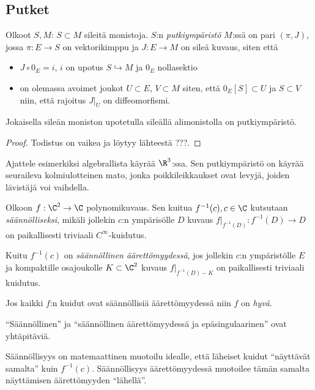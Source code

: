 \subsection{Putket}
\begin{maaritelma}
    Olkoot $S,M$: $S\subset M$ sileitä monistoja. $S$:n \emph{putkiympäristö} $M$:ssä on pari $(\pi, J)$, jossa $\pi: E\to S$ on vektorikimppu ja $J:E\to M$ on sileä kuvaus, siten että
    \begin{itemize}
        \item $J\circ0_E=i$, $i$ on upotus $S\hookrightarrow M$ ja $0_E$ nollasektio
        \item on olemassa avoimet joukot $U\subset E$, $V\subset M$ siten, että $0_E[S]\subset U$ ja $S\subset V$ niin, että rajoitus $J|_U$ on diffeomorfismi.
    \end{itemize}
\end{maaritelma}
\begin{lause}[Putkiympäristölause]
    Jokaisella sileän moniston upotetulla sileällä alimonistolla on putkiympäristö.
\end{lause}
\begin{proof}
    Todistus on vaikea ja löytyy lähteestä ???.
\end{proof}
\begin{ajatus}
    Ajattele esimerkiksi algebrallista käyrää $\R^3$:ssa. Sen putkiympäristö on käyrää seuraileva kolmiulotteinen mato, jonka poikkileikkaukset ovat levyjä, joiden lävistäjä voi vaihdella.
\end{ajatus}
\begin{maaritelma}
    Olkoon $f:\C^2\to\C$ polynomikuvaus. Sen kuitua $f^{-1}(c),c\in\C$ kutsutaan \emph{säännölliseksi}, mikäli jollekin $c$:n ympärisölle $D$ kuvaus $f|_{f^{-1}(D)}:f^{-1}(D)\to D$ on paikallisesti triviaali $C^\infty$-kuidutus.

    Kuitu $f^{-1}(c)$ on \emph{säännöllinen äärettömyydessä}, jos jollekin $c$:n ympäristölle $E$ ja kompaktille osajoukolle $K\subset\C^2$ kuvaus $f|_{f^{-1}(D)-K}$ on paikallisesti triviaali kuidutus. 

    Jos kaikki $f$:n kuidut ovat säännöllisiä äärettömyydessä niin $f$ on \emph{hyvä}.
\end{maaritelma}
\begin{huomautus}
    ``Säännöllinen'' ja ``säännöllinen äärettömyydessä ja epäsingulaarinen'' ovat yhtäpitäviä.
\end{huomautus}
\begin{ajatus}
    Säännöllisyys on matemaattinen muotoilu idealle, että läheiset kuidut ``näyttävät samalta'' kuin $f^{-1}(c)$. Säännöllisyys äärettömyydessä muotoilee tämän samalta näyttämisen äärettömyyden ``lähellä''.
\end{ajatus}